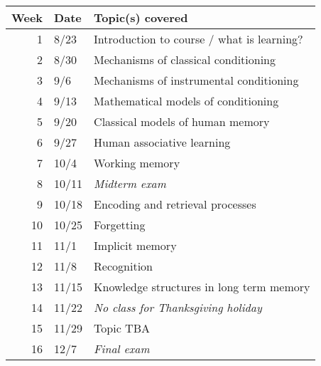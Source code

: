 \documentclass[10pt]{article}
\begin{document}
\begin{center}
\begin{tabular}{rll}
Week & Date & Topic(s) covered\\
\hline
1 & 8/23 & Introduction to course / what is learning?\\
2 & 8/30 & Mechanisms of classical conditioning\\
3 & 9/6 & Mechanisms of instrumental conditioning\\
4 & 9/13 & Mathematical models of conditioning\\
5 & 9/20 & Classical models of human memory\\
6 & 9/27 & Human associative learning\\
7 & 10/4 & Working memory\\
8 & 10/11 & \emph{Midterm exam}\\
9 & 10/18 & Encoding and retrieval processes\\
10 & 10/25 & Forgetting\\
11 & 11/1 & Implicit memory\\
12 & 11/8 & Recognition\\
13 & 11/15 & Knowledge structures in long term memory\\
14 & 11/22 & \emph{No class for Thanksgiving holiday}\\
15 & 11/29 & Topic TBA\\
16 & 12/7 & \emph{Final exam}\\
\end{tabular}
\end{center}
\end{document}
